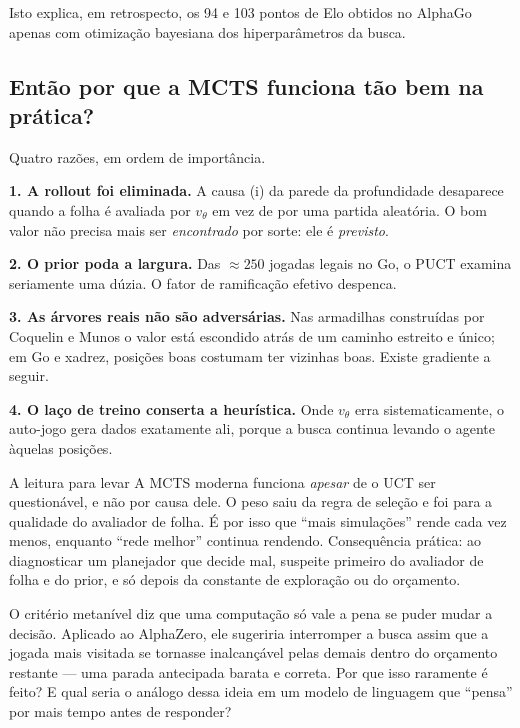 \documentclass[11pt]{article}
\newcommand{\redeval}{v_{\theta}}
\begin{document}
Isto explica, em retrospecto, os 94 e 103 pontos de Elo obtidos no AlphaGo apenas
com otimização bayesiana dos hiperparâmetros da busca.

\subsection{Então por que a MCTS funciona tão bem na prática?}

Quatro razões, em ordem de importância.

\textbf{1. A rollout foi eliminada.} A causa (i) da parede da profundidade
desaparece quando a folha é avaliada por $\redeval$ em vez de por uma partida
aleatória. O bom valor não precisa mais ser \emph{encontrado} por sorte: ele é
\emph{previsto}.

\textbf{2. O prior poda a largura.} Das $\approx 250$ jogadas legais no Go, o PUCT
examina seriamente uma dúzia. O fator de ramificação efetivo despenca.

\textbf{3. As árvores reais não são adversárias.} Nas armadilhas construídas por
Coquelin e Munos o valor está escondido atrás de um caminho estreito e único; em
Go e xadrez, posições boas costumam ter vizinhas boas. Existe gradiente a seguir.

\textbf{4. O laço de treino conserta a heurística.} Onde $\redeval$ erra
sistematicamente, o auto-jogo gera dados exatamente ali, porque a busca continua
levando o agente àquelas posições.

\begin{teobox}{A leitura para levar}
A MCTS moderna funciona \emph{apesar} de o UCT ser questionável, e não por causa
dele. O peso saiu da regra de seleção e foi para a qualidade do avaliador de
folha. É por isso que ``mais simulações'' rende cada vez menos, enquanto ``rede
melhor'' continua rendendo. Consequência prática: ao diagnosticar um planejador
que decide mal, suspeite primeiro do avaliador de folha e do prior, e só depois da
constante de exploração ou do orçamento.
\end{teobox}

\begin{discbox}
O critério metanível diz que uma computação só vale a pena se puder mudar a
decisão. Aplicado ao AlphaZero, ele sugeriria interromper a busca assim que a
jogada mais visitada se tornasse inalcançável pelas demais dentro do orçamento
restante — uma parada antecipada barata e correta. Por que isso raramente é feito?
E qual seria o análogo dessa ideia em um modelo de linguagem que ``pensa'' por
mais tempo antes de responder?
\end{discbox}
\end{document}
